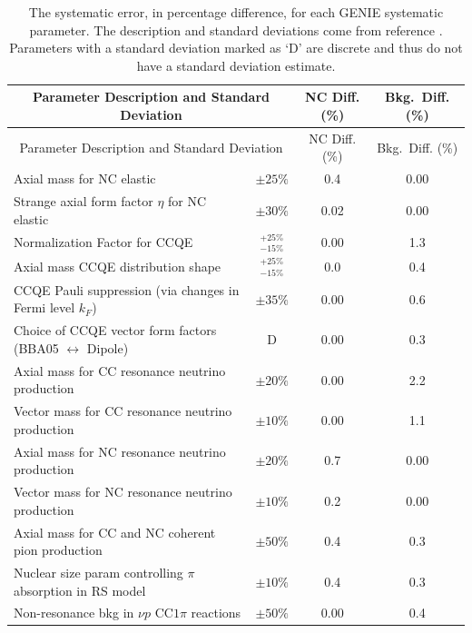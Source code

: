 \singlespacing
\begin{longtable}{p{3.5in} c c c}
  \caption[GENIE Systematic Errors]{The systematic error, in percentage difference, for each GENIE systematic parameter. The description and standard deviations come from reference \cite{ref:GENIE, ref:TNGENIE}. Parameters with a standard deviation marked as `D' are discrete and thus do not have a standard deviation estimate.} \tabularnewline
  \hline\hline
  \multicolumn{2}{c}{Parameter Description and Standard Deviation} & NC Diff. (\%) & Bkg.~Diff. (\%) \\
  \hline \endfirsthead
  \hline\hline
  \multicolumn{2}{c}{Parameter Description and Standard Deviation} & NC Diff. (\%) & Bkg.~Diff. (\%) \\
  \hline \endhead
  Axial mass for NC elastic & $\pm25\%$ & 0.4 & 0.00 \\
  Strange axial form factor $\eta$ for NC elastic & $\pm30\%$ & 0.02 & 0.00 \\
  Normalization Factor for CCQE & $^{+25\%}_{-15\%}$ & 0.00 & 1.3 \\
  Axial mass CCQE distribution shape & $^{+25\%}_{-15\%}$ & 0.0 & 0.4 \\
  CCQE Pauli suppression (via changes in Fermi level $k_F$) & $\pm35\%$ & 0.00 & 0.6 \\
  Choice of CCQE vector form factors \newline (BBA05 $\leftrightarrow$ Dipole) & D & 0.00 & 0.3 \\
  Axial mass for CC resonance neutrino production & $\pm20\%$ & 0.00 & 2.2 \\
  Vector mass for CC resonance neutrino \newline production & $\pm10\%$ & 0.00 & 1.1 \\
  Axial mass for NC resonance neutrino production & $\pm20\%$ & 0.7 & 0.00 \\
  Vector mass for NC resonance neutrino production & $\pm10\%$ & 0.2 & 0.00 \\
  Axial mass for CC and NC coherent pion \newline production & $\pm50\%$ & 0.4 & 0.3 \\
  Nuclear size param controlling $\pi$ absorption in RS model & $\pm10\%$ & 0.4 & 0.3 \\
  Non-resonance bkg in $\nu p$ CC$1\pi$ reactions & $\pm50\%$ & 0.00 & 0.4 \\

\end{longtable}
